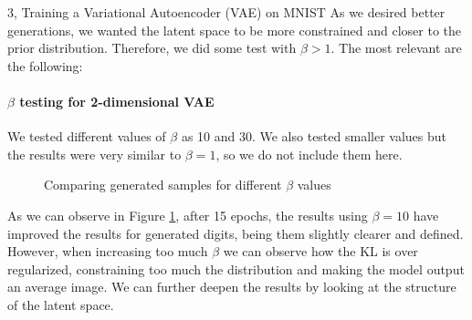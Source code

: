 \begin{task}{3, Training a Variational Autoencoder (VAE) on MNIST}
As we desired better generations, we wanted the latent space to be more constrained and closer to the prior distribution. Therefore, we did some test with \(\beta > 1\). The most relevant are the following:

\paragraph{\(\beta\) testing for 2-dimensional VAE} We tested different values of \(\beta\) as 10 and 30. We also tested smaller values but the results were very similar to \(\beta = 1\), so we do not include them here.

\begin{figure}[H]
    \centering
    \caption{Comparing generated samples for different \(\beta\) values}
    \label{beta2dgenerated}
\end{figure}

As we can observe in Figure \ref{beta2dgenerated}, after 15 epochs, the results using \(\beta = 10\) have improved the results for generated digits, being them slightly clearer and defined. However, when increasing too much \(\beta\) we can observe how the KL is over regularized, constraining too much the distribution and making the model output an average image. We can further deepen the results by looking at the structure of the latent space.


\end{task}
